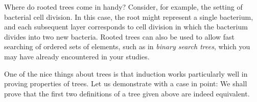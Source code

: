 \documentclass[11pt]{article}
\begin{document}
Where do rooted trees come in handy? Consider, for example, the setting of bacterial cell division. In this case, the root might represent a single bacterium, and each subsequent layer corresponds to cell division in which the bacterium divides into two new bacteria. Rooted trees can also be used to allow fast searching of ordered sets of elements, such as in \emph{binary search trees}, which you may have already encountered in your studies. 

One of the nice things about trees is that induction works particularly well in proving properties of trees. Let us demonstrate with a case in point: We shall prove that the first two definitions of a tree given above are indeed equivalent.
\end{document}
